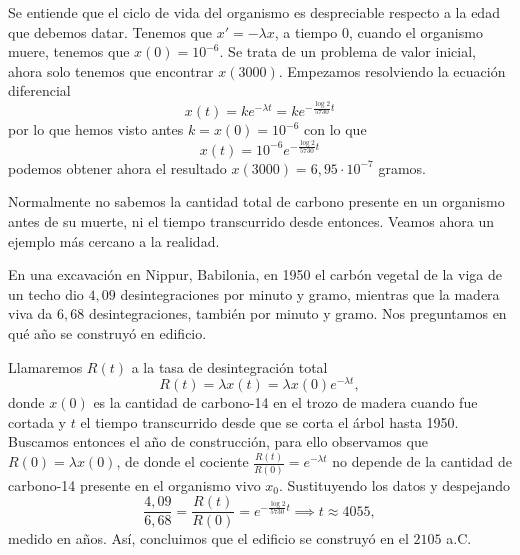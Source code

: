 \documentclass[../ecuaciones_diferenciales.tex]{subfiles}
\begin{document}
\begin{solution}
	Se entiende que el ciclo de vida del organismo
	es despreciable respecto a la edad que debemos datar. Tenemos que
	\(x' = -\lambda x\), a tiempo \(0\), cuando el organismo muere, tenemos que
	\(x(0) = 10^{-6}\). Se trata de un problema de valor inicial, ahora solo tenemos
	que encontrar \(x(3000)\). Empezamos resolviendo la ecuación diferencial
	\[x(t) = k e^{-\lambda t} = k e^{-\frac{\log 2}{5730} t}\]
	por lo que hemos visto antes \(k = x(0) = 10^{-6}\) con lo que
	\[x(t) = 10^{-6} e^{-\frac{\log 2}{5730} t}\]
	podemos obtener ahora el resultado \(x(3000) = 6,95 \cdot 10^{-7}\) gramos.
\end{solution}

Normalmente no sabemos la cantidad total de carbono presente en un organismo
antes de su muerte, ni el tiempo transcurrido desde entonces. Veamos ahora un
ejemplo más cercano a la realidad.

\begin{example}
	En una excavación en Nippur, Babilonia, en 1950 el carbón vegetal de la viga
	de un techo dio \(4,09\) desintegraciones por minuto y gramo, mientras que
	la madera viva da \(6,68\) desintegraciones, también por minuto y gramo.
	Nos preguntamos en qué año se construyó en edificio.
\end{example}

\begin{solution}
	Llamaremos \(R(t)\) a la tasa de desintegración total
	\[R(t) = \lambda x(t) = \lambda x(0) e^{-\lambda t},\]
	donde \(x(0)\) es la
	cantidad de carbono-14 en el trozo de madera cuando fue cortada y \(t\) el
	tiempo transcurrido desde que se corta el árbol hasta 1950. Buscamos entonces
	el año de construcción, para ello observamos que \(R(0) = \lambda x(0)\), de
	donde el cociente \(\frac{R(t)}{R(0)} = e^{-\lambda t}\) no depende de la
	cantidad de carbono-14 presente en el organismo vivo \(x_0\). Sustituyendo
	los datos y despejando
	\[\frac{4,09}{6,68} = \frac{R(t)}{R(0)} = e^{-\frac{\log 2}{5730} t}
		\implies t \approx 4055,\]
	medido en años. Así, concluimos que el edificio se construyó en el \(2105\)
	a.C.
\end{solution}
\end{document}
